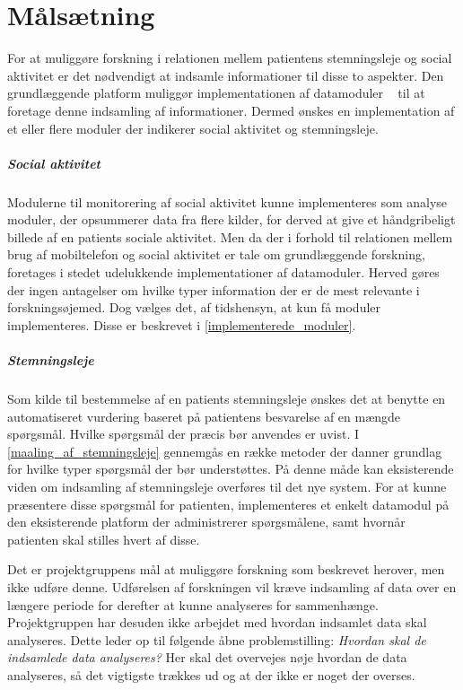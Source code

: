\chapter{Målsætning}\label{problem}
For at muliggøre forskning i relationen mellem patientens stemningsleje og social aktivitet er det nødvendigt at indsamle informationer til disse to aspekter.
Den grundlæggende platform muliggør implementationen af datamoduler ~ til at foretage denne indsamling af informationer.
Dermed ønskes en implementation af et eller flere moduler der indikerer social aktivitet og stemningsleje.

\paragraph{Social aktivitet}
Modulerne til monitorering af social aktivitet kunne implementeres som analyse moduler, der opsummerer data fra flere kilder, for derved at give et håndgribeligt billede af en patients sociale aktivitet.
Men da der i forhold til relationen mellem brug af mobiltelefon og social aktivitet er tale om grundlæggende forskning, foretages i stedet udelukkende implementationer af datamoduler.
Herved gøres der ingen antagelser om hvilke typer information der er de mest relevante i forskningsøjemed.
Dog vælges det, af tidshensyn, at kun få moduler implementeres.
Disse er beskrevet i \cref{implementerede_moduler}.

\paragraph{Stemningsleje}
Som kilde til bestemmelse af en patients stemningsleje ønskes det at benytte en automatiseret vurdering baseret på patientens besvarelse af en mængde spørgsmål.
Hvilke spørgsmål der præcis bør anvendes er uvist.
I \cref{maaling_af_stemningsleje} gennemgås en række metoder der danner grundlag for hvilke typer spørgsmål der bør understøttes.
På denne måde kan eksisterende viden om indsamling af stemningsleje overføres til det nye system.
For at kunne præsentere disse spørgsmål for patienten, implementeres et enkelt datamodul på den eksisterende platform\citefaelles{} der administrerer spørgsmålene, samt hvornår patienten skal stilles hvert af disse.

Det er projektgruppens mål at muliggøre forskning som beskrevet herover, men ikke udføre denne.
Udførelsen af forskningen vil kræve indsamling af data over en længere periode for derefter at kunne analyseres for sammenhænge.
Projektgruppen har desuden ikke arbejdet med hvordan indsamlet data skal analyseres.
Dette leder op til følgende åbne problemstilling: \textit{Hvordan skal de indsamlede data analyseres?}
Her skal det overvejes nøje hvordan de data analyseres, så det vigtigste trækkes ud og at der ikke er noget der overses.

